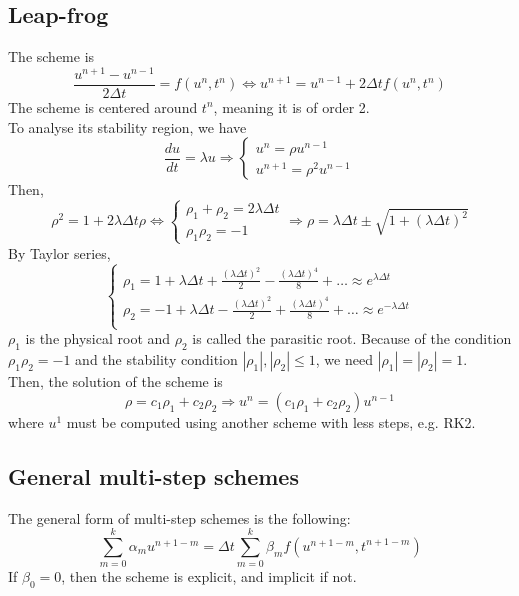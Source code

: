 \documentclass[12pt, openany]{report}
\theoremstyle{definition}
\begin{document}
\subsection{Leap-frog}
The scheme is 
\begin{equation}\label{eq:leapfrog}
	\frac{u^{n+1}-u^{n-1}}{2\Delta t} = f(u^n, t^n)\Longleftrightarrow u^{n+1} = u^{n-1} + 2\Delta t f(u^n, t^n)
\end{equation}
The scheme is centered around $t^n$, meaning it is of order 2.\\
To analyse its stability region, we have 
\begin{equation}
	\frac{du}{dt} = \lambda u \Longrightarrow \begin{cases}
		u^n = \rho u^{n-1}\\u^{n+1} = \rho^2 u^{n-1}
	\end{cases}
\end{equation}
Then, 
\begin{equation}
	\rho^2 = 1+2\lambda \Delta t \rho \Longleftrightarrow \begin{cases}
		\rho_1 + \rho_2 = 2\lambda \Delta t \\
		\rho_1 \rho_2 = -1 
	\end{cases}\Longrightarrow \rho = \lambda \Delta t \pm \sqrt{1+(\lambda \Delta t)^2}
\end{equation}
By Taylor series, 
\begin{equation}
	\begin{cases}
		\rho_1 = 1+\lambda \Delta t + \frac{(\lambda \Delta t)^2}{2} - \frac{(\lambda \Delta t)^4}{8} + \dots \approx e^{\lambda \Delta t}\\
		\rho_2 = -1+\lambda \Delta t - \frac{(\lambda \Delta t)^2}{2} + \frac{(\lambda \Delta t)^4}{8} + \dots \approx e^{-\lambda \Delta t}\\
	\end{cases}
\end{equation}
$\rho_1$ is the physical root and $\rho_2$ is called the parasitic root. Because of the condition $\rho_1\rho_2=-1$ and the stability condition $|\rho_1|,|\rho_2|\le 1$, we need $|\rho_1| = |\rho_2| = 1$.\\

Then, the solution of the scheme is 
\begin{equation}
	\rho = c_1\rho_1 + c_2\rho_2 \Longrightarrow u^n = (c_1\rho_1 + c_2\rho_2)u^{n-1}
\end{equation}
where $u^1$ must be computed using another scheme with less steps, e.g. RK2. 
\subsection{General multi-step schemes}
The general form of multi-step schemes is the following:
\begin{equation}
	\sum_{m=0}^k \alpha_m u^{n+1-m} = \Delta t \sum_{m=0}^k \beta_m f(u^{n+1-m}, t^{n+1-m})
\end{equation}
If $\beta_0=0$, then the scheme is explicit, and implicit if not. 
\end{document}
